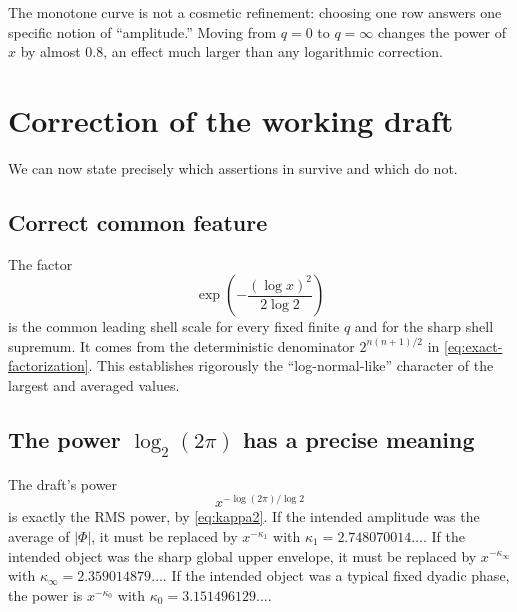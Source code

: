 \documentclass[11pt,oneside]{article}
\theoremstyle{definition}
\theoremstyle{remark}
\newcommand{\Phiup}{\Phi}
\newcommand{\abs}[1]{\left|#1\right|}
\begin{document}
\begin{center}
\end{center}

The monotone curve is not a cosmetic refinement: choosing one row answers one specific
notion of ``amplitude.''  Moving from $q=0$ to $q=\infty$ changes the power of $x$ by almost
$0.8$, an effect much larger than any logarithmic correction.

\section{Correction of the working draft}
\label{sec:draft-correction}

We can now state precisely which assertions in \cite{decay-draft} survive and which do not.

\subsection{Correct common feature}

The factor
\[
 \exp\!\left(-\frac{(\log x)^2}{2\log2}\right)
\]
is the common leading shell scale for every fixed finite $q$ and for the sharp shell
supremum.  It comes from the deterministic denominator
$2^{n(n+1)/2}$ in \eqref{eq:exact-factorization}.  This establishes rigorously the
``log-normal-like'' character of the largest and averaged values.

\subsection{The power $\log_2(2\pi)$ has a precise meaning}

The draft's power
\[
 x^{-\log(2\pi)/\log2}
\]
is exactly the RMS power, by \eqref{eq:kappa2}.  If the intended amplitude was the average
of $\abs{\Phiup}$, it must be replaced by $x^{-\kappa_1}$ with
$\kappa_1=2.748070014\ldots$.  If the intended object was the sharp global upper envelope,
it must be replaced by $x^{-\kappa_\infty}$ with
$\kappa_\infty=2.359014879\ldots$.  If the intended object was a typical fixed dyadic
phase, the power is $x^{-\kappa_0}$ with
$\kappa_0=3.151496129\ldots$.
\end{document}
